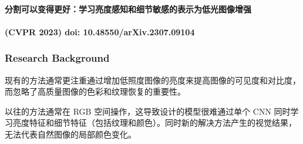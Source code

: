 \documentclass[letterpaper,10pt]{article}
\begin{document}
		\paragraph{分割可以变得更好：学习亮度感知和细节敏感的表示为低光图像增强}
		
		\paragraph{(CVPR 2023) doi: 10.48550/arXiv.2307.09104}
		
			\subsubsection{Research Background}
			
			现有的方法通常更注重通过增加低照度图像的亮度来提高图像的可见度和对比度，而忽略了高质量图像的色彩和纹理恢复的重要性。
			
		    以往的方法通常在 RGB 空间操作，这导致设计的模型很难通过单个 CNN 同时学习亮度特征和细节特征（包括纹理和颜色）。同时新的解决方法产生的视觉结果，无法代表自然图像的局部颜色变化。
			
\end{document}
